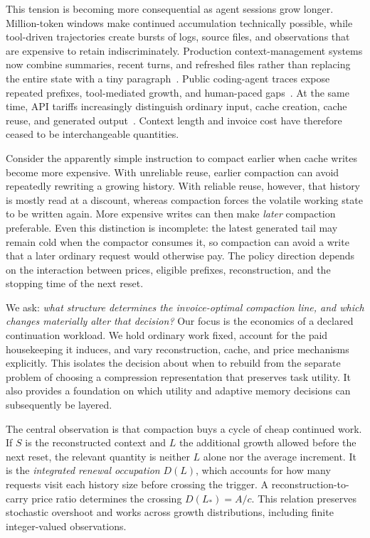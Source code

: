 \documentclass[sigconf,screen,nonacm]{acmart}
\begin{document}
This tension is becoming more consequential as agent sessions grow longer.
Million-token windows make continued accumulation technically possible, while
tool-driven trajectories create bursts of logs, source files, and observations
that are expensive to retain indiscriminately. Production context-management
systems now combine summaries, recent turns, and refreshed files rather than
replacing the entire state with a tiny paragraph~\cite{anthropiccontext,
  sweagent,tokenpilot}. Public coding-agent traces expose repeated prefixes,
tool-mediated growth, and human-paced gaps~\cite{tracelab}. At the same time,
API tariffs increasingly distinguish ordinary input, cache creation, cache
reuse, and generated output~\cite{anthropicprices,openaiprices,qwencache,
  deepseekprices}. Context length and invoice cost have therefore ceased to be
interchangeable quantities.

Consider the apparently simple instruction to compact earlier when cache
writes become more expensive. With unreliable reuse, earlier compaction can
avoid repeatedly rewriting a growing history. With reliable reuse, however,
that history is mostly read at a discount, whereas compaction forces the
volatile working state to be written again. More expensive writes can then
make \emph{later} compaction preferable. Even this distinction is incomplete:
the latest generated tail may remain cold when the compactor consumes it, so
compaction can avoid a write that a later ordinary request would otherwise pay.
The policy direction depends on the interaction between prices, eligible
prefixes, reconstruction, and the stopping time of the next reset.

We ask: \emph{what structure determines the invoice-optimal compaction line,
and which changes materially alter that decision?} Our focus is the economics
of a declared continuation workload. We hold ordinary work fixed, account for
the paid housekeeping it induces, and vary reconstruction, cache, and price
mechanisms explicitly. This isolates the decision about when to rebuild from
the separate problem of choosing a compression representation that preserves
task utility. It also provides a foundation on which utility and adaptive
memory decisions can subsequently be layered.

The central observation is that compaction buys a cycle of cheap continued
work. If $S$ is the reconstructed context and $L$ the additional growth allowed
before the next reset, the relevant quantity is neither $L$ alone nor the
average increment. It is the \emph{integrated renewal occupation} $D(L)$, which
accounts for how many requests visit each history size before crossing the
trigger. A reconstruction-to-carry price ratio determines the crossing
$D(L_*)=A/c$. This relation preserves stochastic overshoot and works across
growth distributions, including finite integer-valued observations.
\end{document}
